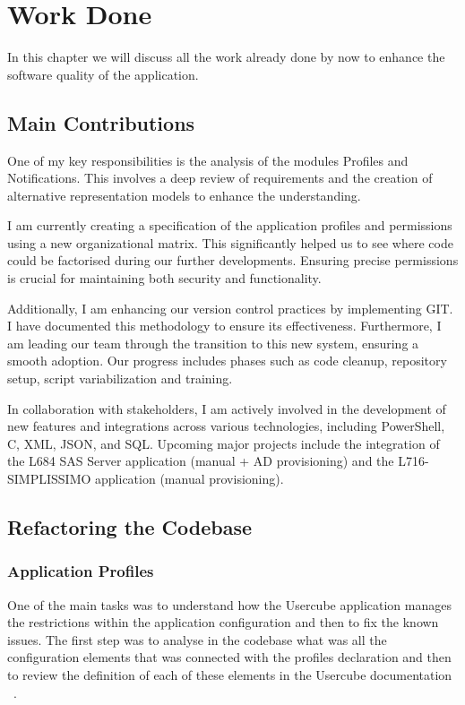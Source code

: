 %

\chapter{Work Done}
\label{Work Done}

In this chapter we will discuss all the work already done by now to enhance the software quality of the application.

\section{Main Contributions}

One of my key responsibilities is the analysis of the modules Profiles and Notifications. This involves a deep review of requirements and the creation of alternative representation models to enhance the understanding.

I am currently creating a specification of the application profiles and permissions using a new organizational matrix. This significantly helped us to see where code could be factorised during our further developments. Ensuring precise permissions is crucial for maintaining both security and functionality.

Additionally, I am enhancing our version control practices by implementing GIT. I have documented this methodology to ensure its effectiveness. Furthermore, I am leading our team through the transition to this new system, ensuring a smooth adoption. Our progress includes phases such as code cleanup, repository setup, script variabilization and training.

In collaboration with stakeholders, I am actively involved in the development of new features and integrations across various technologies, including PowerShell, C, XML, JSON, and SQL. Upcoming major projects include the integration of the L684 SAS Server application (manual + AD provisioning) and the L716-SIMPLISSIMO application (manual provisioning).

\section{Refactoring the Codebase}

\subsection{Application Profiles}

One of the main tasks was to understand how the Usercube application manages the restrictions within the application configuration and then to fix the known issues. The first step was to analyse in the codebase what was all the configuration elements that was connected with the profiles declaration and then to review the definition of each of these elements in the Usercube documentation ~\cite{UsercubeDocument}.

